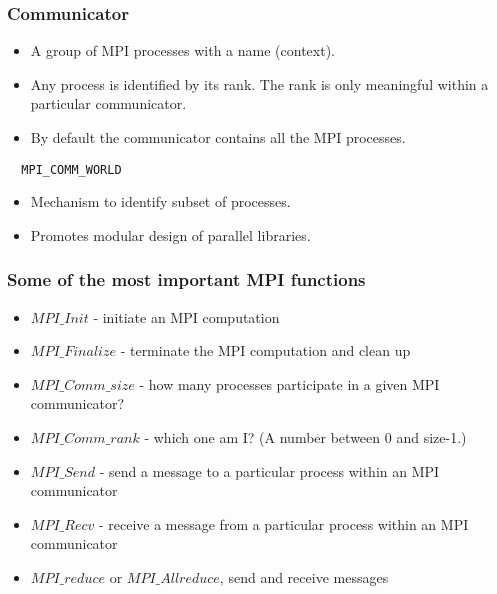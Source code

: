 \documentclass{beamer}
\begin{document}
\begin{frame}
\frametitle{Communicator}

\begin{block}{}
\begin{itemize}
\item A group of MPI processes with a name (context).

\item Any process is identified by its rank. The rank is only meaningful within a particular communicator.

\item By default the communicator contains all the MPI processes.
\end{itemize}

\noindent
\begin{verbatim}
  MPI_COMM_WORLD 
\end{verbatim}
\begin{itemize}
\item Mechanism to identify subset of processes.

\item Promotes modular design of parallel libraries.
\end{itemize}

\noindent
\end{block}
\end{frame}

\begin{frame}
\frametitle{Some of the most  important MPI functions}

\begin{block}{}



\begin{itemize}
\item $MPI\_Init$ - initiate an MPI computation

\item $MPI\_Finalize$ - terminate the MPI computation and clean up

\item $MPI\_Comm\_size$ - how many processes participate in a given MPI communicator?

\item $MPI\_Comm\_rank$ - which one am I? (A number between 0 and size-1.)

\item $MPI\_Send$ - send a message to a particular process within an MPI communicator

\item $MPI\_Recv$ - receive a message from a particular process within an MPI communicator

\item $MPI\_reduce$  or $MPI\_Allreduce$, send and receive messages
\end{itemize}

\noindent
\end{block}
\end{frame}
\end{document}
